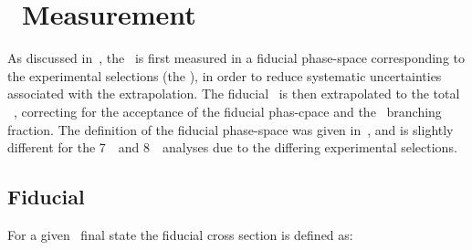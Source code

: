 
\section{\CX\ Measurement}

As discussed in~, the \cx\ is first measured in a fiducial phase-space
corresponding to the experimental selections (the ), in
order to reduce systematic uncertainties associated with the extrapolation. The
fiducial \cx\ is then extrapolated to the total \ZZ\ \cx, correcting for the
acceptance of the fiducial phas-cpace and the \ZZllll\ branching fraction.  The definition of the
fiducial phase-space was given in~, and is slightly different for the
7~\tev\ and 8~\tev\ analyses due to the differing experimental selections.

\subsection{Fiducial \CX}

For a given \ZZllll\ final state the fiducial cross section is defined as:

